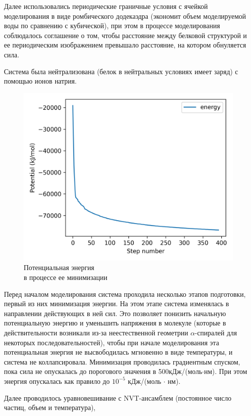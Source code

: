 \documentclass[
11pt,%
tightenlines,%
twoside,%
onecolumn,%
nofloats,%
nobibnotes,%
nofootinbib,%
superscriptaddress,%
noshowpacs,%
centertags]%
{revtex4}
\begin{document}
Далее использовались периодические граничные условия с ячейкой моделирования 
в виде ромбического додекаэдра (экономит объем моделируемой воды по сравнению с кубической),
при этом в процессе моделирования соблюдалось соглашение о том, 
чтобы расстояние между белковой структурой и ее периодическим изображением превышало расстояние,
на котором обнуляется сила.\par
Система была нейтрализована (белок в нейтральных условиях имеет заряд) с помощью ионов натрия. \par
\begin{figure}
	\centering
	\includegraphics[scale=0.6]{potential}
	\caption{Потенциальная энергия \\ в процессе ее минимизации}
\end{figure}
Перед началом моделирования система проходила несколько этапов подготовки, первый из них минимизация энергии.
На этом этапе система изменялась в направлении действующих в ней сил. 
Это позволяет понизить начальную потенциальную энергию и уменьшить напряжения в молекуле
(которые в действительности возникали из-за неестественной геометрии $\alpha$-спиралей для некоторых последовательностей),
чтобы при начале моделирования эта потенциальная энергия не высвободилась мгновенно в виде температуры,
и система не коллапсировала.
Минимизация проводилась градиентным спуском, пока сила не опускалась до порогового значения в 500кДж/(моль$\cdot$нм). При этом энергия опускалась как правило до $10^{-5}$ кДж/(моль $\cdot$ нм). \par
Далее проводилось уравновешивание с NVT-ансамблем (постоянное число частиц, объем и температура),
\end{document}
